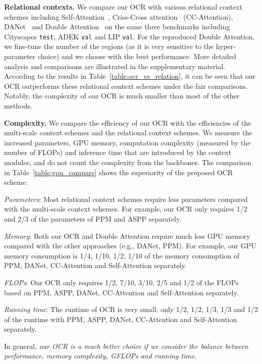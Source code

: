 \documentclass[runningheads]{llncs}
\begin{document}
\noindent\textbf{Relational contexts.}
We compare our OCR with various relational context schemes including
Self-Attention~\cite{vaswani2017attention,wang2018non}, Criss-Cross attention~\cite{Huang_2019_ICCV} (CC-Attention), DANet~\cite{fu2018dual} and Double Attention~\cite{A2Net} on the same 
three benchmarks including Cityscapes \texttt{test}, ADEK \texttt{val} and LIP \texttt{val}.
For the reproduced Double Attention, we fine-tune the number of the regions (as it is very sensitive to the hyper-parameter choice) and we choose  with the best performance.
More detailed analysis and comparisons are illustrated in the supplementary material.
According to the results in Table~\ref{table:ocr_vs_relation},
it can be seen that our OCR outperforms these relational context schemes
under the fair comparisons.
Notably, the complexity of our OCR is much smaller than most of the other methods.





\noindent\textbf{Complexity.}
We compare the efficiency of our OCR with the efficiencies of the multi-scale context schemes and the relational context schemes.
We measure the increased parameters, GPU memory, computation complexity (measured by the number of FLOPs) and inference time
that are introduced by the context modules,
and do not count the complexity from the backbones.
The comparison in Table~\ref{table:gpu_compare}
shows the superiority of the proposed OCR scheme.

\noindent \emph{Parameters}:
Most relational context schemes require less parameters compared with the multi-scale context schemes.
For example, our OCR only requires 1/2 and 2/3 of the parameters of PPM and ASPP separately.

\noindent \emph{Memory}:
Both our OCR and Double Attention require much less GPU memory compared with the other approaches (e.g., DANet, PPM).
For example, 
our GPU memory consumption is 1/4, 1/10, 1/2, 1/10 of the memory consumption of 
PPM, DANet, CC-Attention
and Self-Attention separately.

\noindent \emph{FLOPs}:
Our OCR only requires 1/2, 7/10, 3/10, 2/5 and 1/2 of the FLOPs based on
PPM, ASPP, DANet, CC-Attention and Self-Attention separately.

\noindent \emph{Running time}:
The runtime of OCR is very small: only 1/2, 1/2, 1/3, 1/3 and 1/2 of
the runtime with PPM, ASPP, DANet, CC-Attention and Self-Attention separately.

In general,
\emph{
our OCR is a much better choice
if we consider the balance between
performance, memory complexity, GFLOPs and running time.
}
\end{document}
